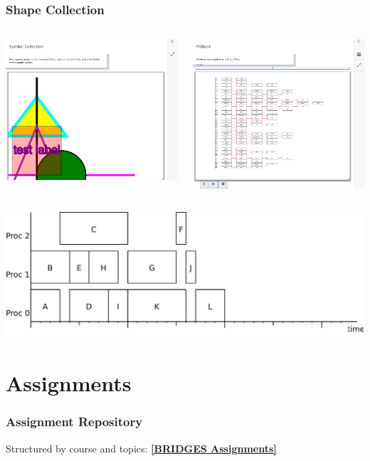 \documentclass[aspectratio=169]{beamer}
\begin{document}
\begin{frame}
  \frametitle{Shape Collection}

  \begin{columns}
    \includegraphics[width=1\linewidth]{viz_figs/Shape1.png}

    \includegraphics[width=1\linewidth]{viz_figs/Shape2.png}
  \end{columns}  

  \includegraphics[width=.4\linewidth]{viz_figs/gantt-ls.pdf}
\end{frame}

\section{Assignments}

\begin{frame}
  \frametitle{Assignment Repository}

  Structured by course and topics: 
  \href{http://bridgesuncc.github.io/newassignments.html}{\color{purple} \bf [BRIDGES Assignments]}
  

\end{frame}
\end{document}
